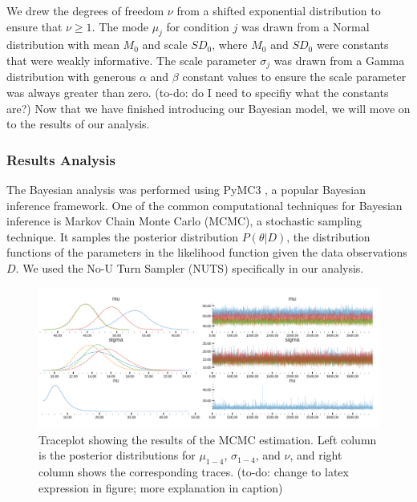 We drew the degrees of freedom $\nu$ from a shifted exponential distribution to ensure that $\nu \geq 1$. The mode $\mu_j$ for condition $j$ was drawn from a Normal distribution with mean $M_0$ and scale $SD_0$, where $M_0$ and $SD_0$ were constants that were weakly informative. The scale parameter $\sigma_j$ was drawn from a Gamma distribution with generous $\alpha$ and $\beta$ constant values to ensure the scale parameter was always greater than zero. (to-do: do I need to specifiy what the constants are?) Now that we have finished introducing our Bayesian model, we will move on to the results of our analysis.

\subsubsection{Results Analysis}
    

The Bayesian analysis was performed using PyMC3 \cite{salvatier2016probabilistic}, a popular Bayesian inference framework. One of the common computational techniques for Bayesian inference is Markov Chain Monte Carlo (MCMC), a stochastic sampling technique. It samples the posterior distribution $P(\theta | D)$, the distribution functions of the parameters in the likelihood function given the data observations $D$. We used the No-U Turn Sampler (NUTS) specifically in our analysis. 

\begin{figure}[htpb]
    \centering
    \includegraphics[width=\textwidth, keepaspectratio=true]{content/image/traceplot.png}
    \caption{
      Traceplot showing the results of the MCMC estimation. Left column is the posterior distributions for $\mu_{1-4}$, $\sigma_{1-4}$, and $\nu$, and right column shows the corresponding traces. (to-do: change to latex expression in figure; more explanation in caption)
    }
    \label{fig:traceplot_exp1}
\end{figure}

